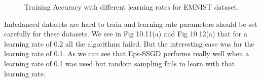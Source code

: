 \documentclass[a4paper,twoside]{iiththesis}
\theoremstyle{definition}
\theoremstyle{definition}
\theoremstyle{remark}
\begin{document}
\begin{figure}[H]
    \caption{Training Accuracy with different learning rates for EMNIST dataset.}
    \label{fig:Emnist Learning Rate Loss}
\end{figure}
Imbalanced datasets are hard to train and learning rate parameters should be set carefully for these datasets. We see in Fig 10.11(a) and Fig 10.12(a) that for a learning rate of 0.2 all the algorithms failed. But the interesting case was for the learning rate of 0.1. As we can see that Eps-SSGD performs really well when a learning rate of 0.1 was used but random sampling fails to learn with that learning rate.
\newpage
\end{document}

